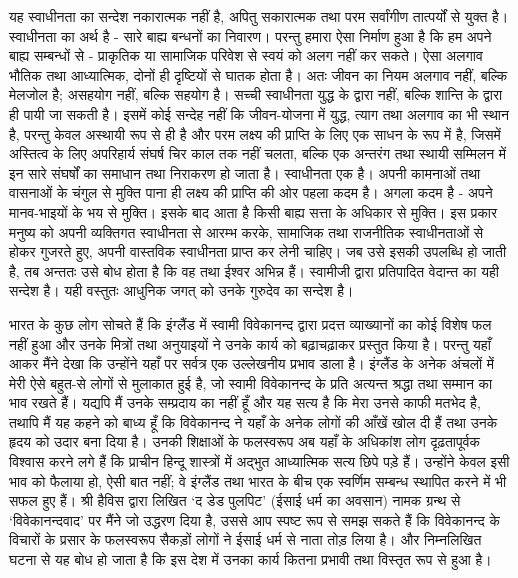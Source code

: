 यह स्वाधीनता का सन्देश नकारात्मक नहीं है, अपितु सकारात्मक तथा परम सर्वांगीण तात्पर्यों से युक्त है। स्वाधीनता का अर्थ है - सारे बाह्य बन्धनों का निवारण। परन्तु हमारा ऐसा निर्माण हुआ है कि हम अपने बाह्य सम्बन्धों से - प्राकृतिक या सामाजिक परिवेश से स्वयं को अलग नहीं कर सकते। ऐसा अलगाव भौतिक तथा आध्यात्मिक, दोनों ही दृष्टियों से घातक होता है। अतः जीवन का नियम अलगाव नहीं, बल्कि मेलजोल है; असहयोग नहीं, बल्कि सहयोग है। सच्ची स्वाधीनता युद्ध के द्वारा नहीं, बल्कि शान्ति के द्वारा ही पायी जा सकती है। इसमें कोई सन्देह नहीं कि जीवन-योजना में युद्ध, त्याग तथा अलगाव का भी स्थान है, परन्तु केवल अस्थायी रूप से ही है और परम लक्ष्य की प्राप्ति के लिए एक साधन के रूप में है, जिसमें अस्तित्व के लिए अपरिहार्य संघर्ष चिर काल तक नहीं चलता, बल्कि एक अन्तरंग तथा स्थायी सम्मिलन में इन सारे संघर्षों का समाधान तथा निराकरण हो जाता है। स्वाधीनता एक है। अपनी कामनाओं तथा वासनाओं के चंगुल से मुक्ति पाना ही लक्ष्य की प्राप्ति की ओर पहला कदम है। अगला कदम है - अपने मानव-भाइयों के भय से मुक्ति। इसके बाद आता है किसी बाह्य सत्ता के अधिकार से मुक्ति। इस प्रकार मनुष्य को अपनी व्यक्तिगत स्वाधीनता से आरम्भ करके, सामाजिक तथा राजनीतिक स्वाधीनताओं से होकर गुजरते हुए, अपनी वास्तविक स्वाधीनता प्राप्त कर लेनी चाहिए। जब उसे इसकी उपलब्धि हो जाती है, तब अन्ततः उसे बोध होता है कि वह तथा ईश्वर अभिन्न हैं। स्वामीजी द्वारा प्रतिपादित वेदान्त का यही सन्देश है। यही वस्तुतः आधुनिक जगत् को उनके गुरुदेव का सन्देश है। 

भारत के कुछ लोग सोचते हैं कि इंग्लैंड में स्वामी विवेकानन्द द्वारा प्रदत्त व्याख्यानों का कोई विशेष फल नहीं हुआ और उनके मित्रों तथा अनुयाइयों ने उनके कार्य को बढ़ाचढ़ाकर प्रस्तुत किया है। परन्तु यहाँ आकर मैंने देखा कि उन्होंने यहाँ पर सर्वत्र एक उल्लेखनीय प्रभाव डाला है। इंग्लैंड के अनेक अंचलों में मेरी ऐसे बहुत-से लोगों से मुलाकात हुई है, जो स्वामी विवेकानन्द के प्रति अत्यन्त श्रद्धा तथा सम्मान का भाव रखते हैं। यद्यपि मैं उनके सम्प्रदाय का नहीं हूँ और यह सत्य है कि मेरा उनसे काफी मतभेद है, तथापि मैं यह कहने को बाध्य हूँ कि विवेकानन्द ने यहाँ के अनेक लोगों की आँखें खोल दी हैं तथा उनके हृदय को उदार बना दिया है। उनकी शिक्षाओं के फलस्वरूप अब यहाँ के अधिकांश लोग दृढ़तापूर्वक विश्वास करने लगे हैं कि प्राचीन हिन्दू शास्त्रों में अद्भुत आध्यात्मिक सत्य छिपे पड़े हैं। उन्होंने केवल इसी भाव को फैलाया हो, ऐसी बात नहीं; वे इंग्लैंड तथा भारत के बीच एक स्वर्णिम सम्बन्ध स्थापित करने में भी सफल हुए हैं। श्री हैविस द्वारा लिखित ‘द डेड पुलपिट’ (ईसाई धर्म का अवसान) नामक ग्रन्थ से ‘विवेकानन्दवाद’ पर मैंने जो उद्धरण दिया है, उससे आप स्पष्ट रूप से समझ सकते हैं कि विवेकानन्द के विचारों के प्रसार के फलस्वरूप सैकड़ों लोगों ने ईसाई धर्म से नाता तोड़ लिया है। और निम्नलिखित घटना से यह बोध हो जाता है कि इस देश में उनका कार्य कितना प्रभावी तथा विस्तृत रूप से हुआ है। 

